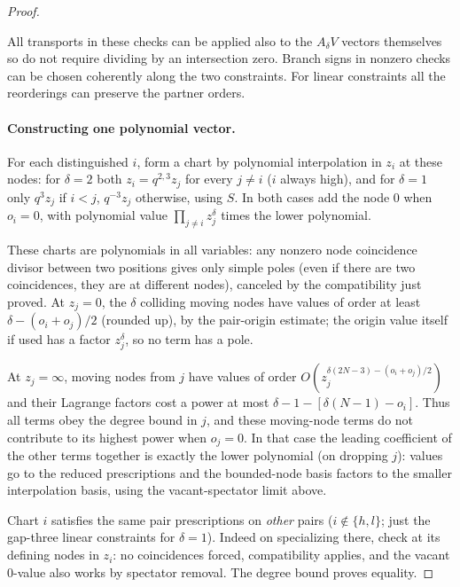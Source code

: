 \documentclass[11pt]{article}
\numberwithin{equation}{section}
\theoremstyle{definition}\newtheorem{definition}[theorem]{Definition}
\theoremstyle{remark}\newtheorem{remark}[theorem]{Remark}
\begin{document}
\begin{proof}
\begin{itemize}
\end{itemize}
All transports in these checks can be applied also to the \(A_\delta V\) vectors themselves so do not require dividing by an intersection zero. Branch signs in nonzero checks can be chosen coherently along the two constraints. For linear constraints all the reorderings can preserve the partner orders.

\paragraph{Constructing one polynomial vector.}
For each distinguished \(i\), form a chart by polynomial interpolation in \(z_i\) at these nodes: for \(\delta=2\) both \(z_i=q^{2,3}z_j\) for every \(j\ne i\) (\(i\) always high), and for \(\delta=1\) only \(q^3z_j\) if \(i<j\), \(q^{-3}z_j\) otherwise, using \(S\). In both cases add the node 0 when \(o_i=0\), with polynomial value \(\prod_{j\ne i}z_j^\delta\) times the lower polynomial. 

These charts are polynomials in all variables: any nonzero node coincidence divisor between two positions gives only simple poles (even if there are two coincidences, they are at different nodes), canceled by the compatibility just proved. At \(z_j=0\), the \(\delta\) colliding moving nodes have values of order at least \(\delta-(o_i+o_j)/2\) (rounded up), by the pair-origin estimate; the origin value itself if used has a factor \(z_j^\delta\), so no term has a pole. 

At \(z_j=\infty\), moving nodes from \(j\) have values of order \(O(z_j^{\delta(2N-3)-(o_i+o_j)/2})\) and their Lagrange factors cost a power at most \(\delta-1-[\delta(N-1)-o_i]\). Thus all terms obey the degree bound in \(j\), and these moving-node terms do not contribute to its highest power when \(o_j=0\). In that case the leading coefficient of the other terms together is exactly the lower polynomial (on dropping \(j\)): values go to the reduced prescriptions and the bounded-node basis factors to the smaller interpolation basis, using the vacant-spectator limit above.

Chart \(i\) satisfies the same pair prescriptions on \emph{other} pairs (\(i\notin\{h,l\}\); just the gap-three linear constraints for \(\delta=1\)). Indeed on specializing there, check at its defining nodes in \(z_i\): no coincidences forced, compatibility applies, and the vacant 0-value also works by spectator removal. The degree bound proves equality. 


\end{proof}
\end{document}
